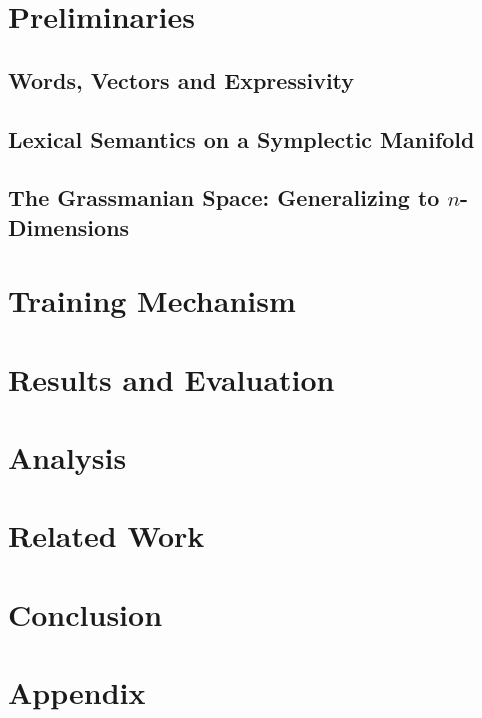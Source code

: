 \documentclass{article} %
\begin{document}

\section{Preliminaries}

\subsection{Words, Vectors and Expressivity}

\subsection{Lexical Semantics on a Symplectic Manifold}

\subsection{The Grassmanian Space: Generalizing to $n$-Dimensions}

\section{Training Mechanism}

\section{Results and Evaluation}

\section{Analysis}

\section{Related Work}

\section{Conclusion}




\appendix
\section{Appendix}
\end{document}
